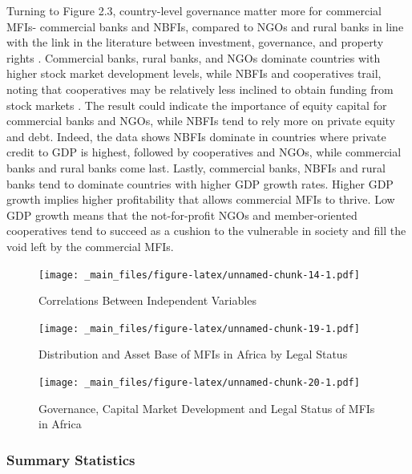 \documentclass[a4paper, nobind]{templates/ociamthesis}
\begin{document}
Turning to Figure 2.3, country-level governance matter more for commercial MFIs- commercial banks and NBFIs, compared to NGOs and rural banks in line with the link in the literature between investment, governance, and property rights \autocite{claessens2003financial}. Commercial banks, rural banks, and NGOs dominate countries with higher stock market development levels, while NBFIs and cooperatives trail, noting that cooperatives may be relatively less inclined to obtain funding from stock markets \autocite{porter1987economic}. The result could indicate the importance of equity capital for commercial banks and NGOs, while NBFIs tend to rely more on private equity and debt. Indeed, the data shows NBFIs dominate in countries where private credit to GDP is highest, followed by cooperatives and NGOs, while commercial banks and rural banks come last. Lastly, commercial banks, NBFIs and rural banks tend to dominate countries with higher GDP growth rates. Higher GDP growth implies higher profitability that allows commercial MFIs to thrive. Low GDP growth means that the not-for-profit NGOs and member-oriented cooperatives tend to succeed as a cushion to the vulnerable in society and fill the void left by the commercial MFIs.

\newpage

\begin{landscape}

\begin{figure}
\centering
\texttt{[image: \_main\_files/figure-latex/unnamed-chunk-14-1.pdf]}
\caption{\label{fig:unnamed-chunk-14}Correlations Between Independent Variables}
\end{figure}

\begin{figure}
\centering
\texttt{[image: \_main\_files/figure-latex/unnamed-chunk-19-1.pdf]}
\caption{\label{fig:unnamed-chunk-19}Distribution and Asset Base of MFIs in Africa by Legal Status}
\end{figure}

\begin{figure}
\centering
\texttt{[image: \_main\_files/figure-latex/unnamed-chunk-20-1.pdf]}
\caption{\label{fig:unnamed-chunk-20}Governance, Capital Market Development and Legal Status of MFIs in Africa}
\end{figure}

\end{landscape}

\newpage

\hypertarget{summary-statistics}{%
\subsubsection{Summary Statistics}\label{summary-statistics}}
\end{document}
